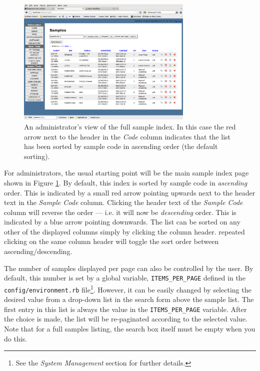 \documentclass[12pt,twoside]{article}
\begin{document}
\begin{figure}[!htb]
\begin{center}
\includegraphics[width=0.75\textwidth]{sampleindex}
\caption{An administrator's view of the full sample index. 
In this case the red arrow next to the header in the \emph{Code}
column indicates that the list has been sorted by sample code in
ascending order (the default sorting).\label{fig:sampleindex}}
\end{center}
\end{figure}

For administrators, the usual starting point will be the main sample
index page shown in Figure \ref{fig:sampleindex}.
By default, this index is sorted by sample code in \emph{ascending} order.
This is indicated by a small red arrow pointing upwards next to the header
text in the \emph{Sample Code} column. 
Clicking the header text of the \emph{Sample Code} column will reverse the
order --- i.e. it will now be \emph{descending} order. This is indicated
by a blue arrow pointing downwards.
The list can be sorted on any other of the displayed columns simply by
clicking the column header. repeated clicking on the same column header
will toggle the sort order between ascending/descending.

The number of samples displayed per page can also be controlled by the
user. By default, this number is set by a global variable,
\verb=ITEMS_PER_PAGE= defined in the \verb=config/environment.rb= file\footnote{See the \emph{System Management} section for further details.}.
However, it can be easily changed by selecting the desired value from
a drop-down list in the search form above the sample list.
The first entry in this list is always the value in the
\verb=ITEMS_PER_PAGE= variable.
After the choice is made, the list will be re-paginated according to
the selected value. Note that for a full samples listing, the search box
itself must be empty when you do this.
\end{document}
